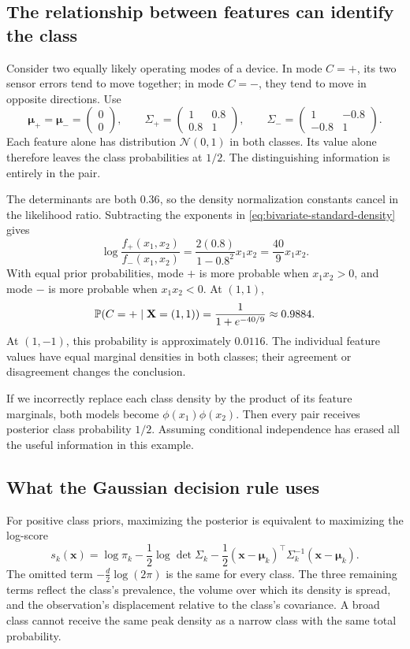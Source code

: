 \subsection{The relationship between features can identify the class}

Consider two equally likely operating modes of a device. In mode
\(C=+\), its two sensor errors tend to move together; in mode \(C=-\),
they tend to move in opposite directions. Use
\[
  \boldsymbol\mu_+=\boldsymbol\mu_-=
  \begin{pmatrix}0\\0\end{pmatrix},\qquad
  \Sigma_+=\begin{pmatrix}1&0.8\\0.8&1\end{pmatrix},\qquad
  \Sigma_-=\begin{pmatrix}1&-0.8\\-0.8&1\end{pmatrix}.
\]
Each feature alone has distribution \(\mathcal N(0,1)\) in both
classes. Its value alone therefore leaves the class probabilities at
\(1/2\). The distinguishing information is entirely in the pair.

The determinants are both \(0.36\), so the density normalization
constants cancel in the likelihood ratio. Subtracting the exponents
in \eqref{eq:bivariate-standard-density} gives
\[
  \log\frac{f_+(x_1,x_2)}{f_-(x_1,x_2)}
  =\frac{2(0.8)}{1-0.8^2}x_1x_2=\frac{40}{9}x_1x_2.
\]
With equal prior probabilities, mode \(+\) is more probable when
\(x_1x_2>0\), and mode \(-\) is more probable when \(x_1x_2<0\).
At \((1,1)\),
\[
  \mathbb{P}(C=+\mid\mathbf X=(1,1))
  =\frac{1}{1+e^{-40/9}}\approx0.9884.
\]
At \((1,-1)\), this probability is approximately \(0.0116\).
The individual feature values have equal marginal densities in both
classes; their agreement or disagreement changes the conclusion.

If we incorrectly replace each class density by the product of its
feature marginals, both models become \(\phi(x_1)\phi(x_2)\). Then
every pair receives posterior class probability \(1/2\).
Assuming conditional independence has erased all the useful information
in this example.

\subsection{What the Gaussian decision rule uses}

For positive class priors, maximizing the posterior is equivalent to
maximizing the log-score
\[
  s_k(\mathbf x)=\log\pi_k-\frac12\log\det\Sigma_k
   -\frac12(\mathbf x-\boldsymbol\mu_k)^\top
           \Sigma_k^{-1}(\mathbf x-\boldsymbol\mu_k).
\]
The omitted term \(-\tfrac d2\log(2\pi)\) is the same for every class.
The three remaining terms reflect the class's prevalence, the volume
over which its density is spread, and the observation's displacement
relative to the class's covariance. A broad class cannot receive the
same peak density as a narrow class with the same total probability.

